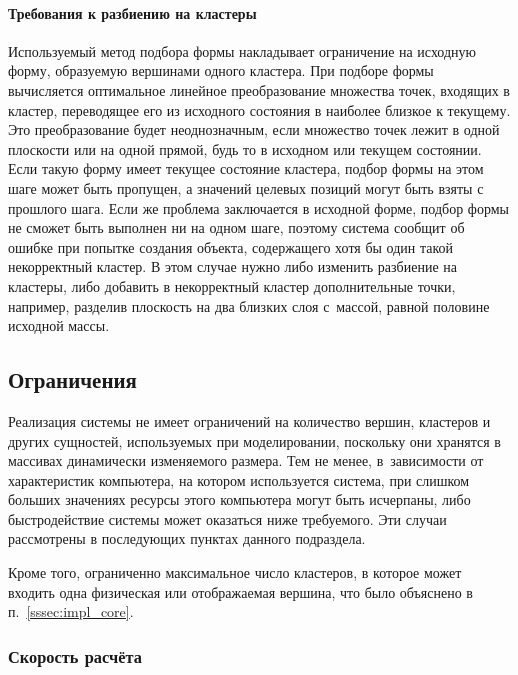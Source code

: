 \documentclass[a4paper, 14pt, titlepage]{extarticle}
\begin{document}
      \paragraph{Требования к разбиению на кластеры}
      Используемый метод подбора формы накладывает ограничение на исходную форму, образуемую
      вершинами одного кластера. При подборе формы вычисляется оптимальное линейное преобразование
      множества точек, входящих в кластер, переводящее его из исходного состояния в наиболее близкое
      к текущему. Это преобразование будет неоднозначным, если множество точек лежит в одной
      плоскости или на одной прямой, будь то в исходном или текущем состоянии. Если такую форму
      имеет текущее состояние кластера, подбор формы на этом шаге может быть пропущен, а значений
      целевых позиций могут быть взяты с прошлого шага. Если же проблема заключается в
      исходной форме, подбор формы не сможет быть выполнен ни на одном шаге, поэтому система сообщит
      об ошибке при попытке создания объекта, содержащего хотя бы один такой некорректный кластер.
      В этом случае нужно либо изменить разбиение на кластеры, либо добавить в некорректный кластер
      дополнительные точки, например, разделив плоскость на два близких слоя с~массой, равной
      половине исходной массы.

    \subsection{Ограничения}\label{sssec:limitations}

      Реализация системы не имеет ограничений на количество вершин, кластеров и других сущностей,
      используемых при моделировании, поскольку они хранятся в массивах динамически изменяемого размера.
      Тем не менее, в~зависимости от характеристик компьютера, на котором используется система, при слишком
      больших значениях ресурсы этого компьютера могут быть исчерпаны, либо быстродействие системы
      может оказаться ниже требуемого. Эти случаи рассмотрены в последующих пунктах данного
      подраздела.

      Кроме того, ограниченно максимальное число кластеров, в которое может входить одна физическая
      или отображаемая вершина, что было объяснено в п.~\ref{sssec:impl_core}.

      \subsubsection{Скорость расчёта}
\end{document}
